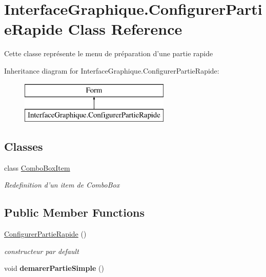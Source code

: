 \hypertarget{class_interface_graphique_1_1_configurer_partie_rapide}{\section{Interface\-Graphique.\-Configurer\-Partie\-Rapide Class Reference}
\label{class_interface_graphique_1_1_configurer_partie_rapide}
}


Cette classe représente le menu de préparation d'une partie rapide  


Inheritance diagram for Interface\-Graphique.\-Configurer\-Partie\-Rapide\-:\begin{figure}[H]
\begin{center}
\leavevmode
\includegraphics[height=2.000000cm]{class_interface_graphique_1_1_configurer_partie_rapide}
\end{center}
\end{figure}
\subsection*{Classes}
\begin{DoxyCompactItemize}
\item 
class \hyperlink{class_interface_graphique_1_1_configurer_partie_rapide_1_1_combo_box_item}{Combo\-Box\-Item}
\begin{DoxyCompactList}\small\item\em Redefinition d'un item de Combo\-Box \end{DoxyCompactList}\end{DoxyCompactItemize}
\subsection*{Public Member Functions}
\begin{DoxyCompactItemize}
\item 
\hyperlink{class_interface_graphique_1_1_configurer_partie_rapide_a3e4cee4d4699fc886275a34c7bd52009}{Configurer\-Partie\-Rapide} ()
\begin{DoxyCompactList}\small\item\em constructeur par default \end{DoxyCompactList}\item 
\hypertarget{class_interface_graphique_1_1_configurer_partie_rapide_a9d6f766fc8fd2f1e4ff8913588d044e4}{void {\bfseries demarer\-Partie\-Simple} ()}\label{class_interface_graphique_1_1_configurer_partie_rapide_a9d6f766fc8fd2f1e4ff8913588d044e4}

\end{DoxyCompactItemize}

